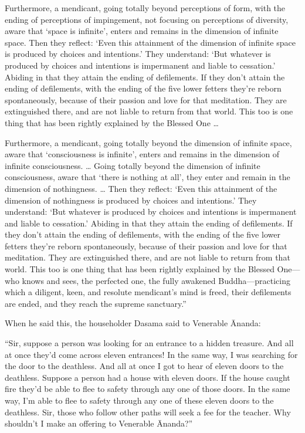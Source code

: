\documentclass[12pt,openany]{book}%
\begin{document}
Furthermore, a mendicant, going totally beyond perceptions of form, with the ending of perceptions of impingement, not focusing on perceptions of diversity, aware that ‘space is infinite’, enters and remains in the dimension of infinite space. Then they reflect: ‘Even this attainment of the dimension of infinite space is produced by choices and intentions.’ They understand: ‘But whatever is produced by choices and intentions is impermanent and liable to cessation.’ Abiding in that they attain the ending of defilements. If they don’t attain the ending of defilements, with the ending of the five lower fetters they’re reborn spontaneously, because of their passion and love for that meditation. They are extinguished there, and are not liable to return from that world. This too is one thing that has been rightly explained by the Blessed One … 

Furthermore, a mendicant, going totally beyond the dimension of infinite space, aware that ‘consciousness is infinite’, enters and remains in the dimension of infinite consciousness. … Going totally beyond the dimension of infinite consciousness, aware that ‘there is nothing at all’, they enter and remain in the dimension of nothingness. … Then they reflect: ‘Even this attainment of the dimension of nothingness is produced by choices and intentions.’ They understand: ‘But whatever is produced by choices and intentions is impermanent and liable to cessation.’ Abiding in that they attain the ending of defilements. If they don’t attain the ending of defilements, with the ending of the five lower fetters they’re reborn spontaneously, because of their passion and love for that meditation. They are extinguished there, and are not liable to return from that world. This too is one thing that has been rightly explained by the Blessed One—who knows and sees, the perfected one, the fully awakened Buddha—practicing which a diligent, keen, and resolute mendicant’s mind is freed, their defilements are ended, and they reach the supreme sanctuary.” 

When he said this, the householder Dasama said to Venerable Ānanda: 

“Sir, suppose a person was looking for an entrance to a hidden treasure. And all at once they’d come across eleven entrances! In the same way, I was searching for the door to the deathless. And all at once I got to hear of eleven doors to the deathless. Suppose a person had a house with eleven doors. If the house caught fire they’d be able to flee to safety through any one of those doors. In the same way, I’m able to flee to safety through any one of these eleven doors to the deathless. Sir, those who follow other paths will seek a fee for the teacher. Why shouldn’t I make an offering to Venerable Ānanda?” 
\end{document}
